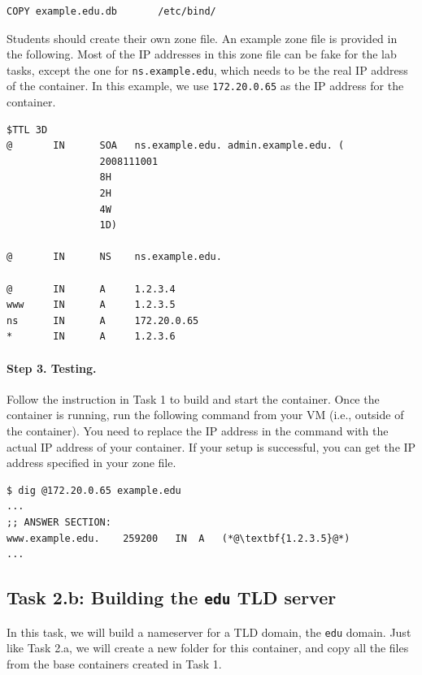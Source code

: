 \begin{lstlisting}
COPY example.edu.db       /etc/bind/
\end{lstlisting}


Students should create their own zone file. An example
zone file is provided in the following. Most of the IP 
addresses in this zone file can be fake for the lab tasks, except 
the one for \texttt{ns.example.edu}, which needs to
be the real IP address of the container. 
In this example, we use \texttt{172.20.0.65} as the IP
address for the container.


\begin{lstlisting}
$TTL 3D
@       IN      SOA   ns.example.edu. admin.example.edu. (
                2008111001
                8H
                2H
                4W
                1D)

@       IN      NS    ns.example.edu.

@       IN      A     1.2.3.4
www     IN      A     1.2.3.5
ns      IN      A     172.20.0.65
*       IN      A     1.2.3.6
\end{lstlisting}
 
 


\paragraph{Step 3. Testing.} Follow the instruction in Task 1 
to build and start the container. Once the container is running,
run the following command from your VM (i.e., outside of the 
container). You need to replace the IP address in the 
command with the actual IP address of your container. If your 
setup is successful, you can get the IP address specified
in your zone file. 

\begin{lstlisting}
$ dig @172.20.0.65 example.edu
... 
;; ANSWER SECTION:
www.example.edu.    259200   IN  A   (*@\textbf{1.2.3.5}@*)
...
\end{lstlisting}




\subsection{Task 2.b: Building the \texttt{edu} TLD server}

In this task, we will build a nameserver for a TLD domain, 
the \texttt{edu} domain.
Just like Task 2.a, we will
create a new folder for this container, and copy all the 
files from the base containers created in Task 1. 

